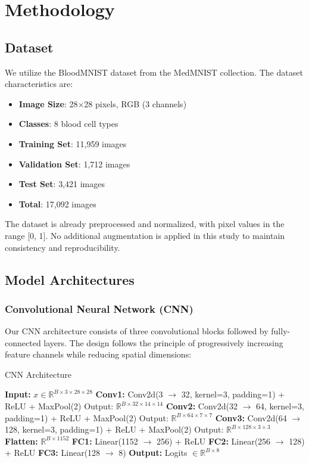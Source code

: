 \documentclass[runningheads]{llncs}
\begin{document}
\section{Methodology}

\subsection{Dataset}

We utilize the BloodMNIST dataset from the MedMNIST collection. The dataset characteristics are:

\begin{itemize}
    \item \textbf{Image Size}: 28$\times$28 pixels, RGB (3 channels)
    \item \textbf{Classes}: 8 blood cell types
    \item \textbf{Training Set}: 11,959 images
    \item \textbf{Validation Set}: 1,712 images
    \item \textbf{Test Set}: 3,421 images
    \item \textbf{Total}: 17,092 images
\end{itemize}

The dataset is already preprocessed and normalized, with pixel values in the range [0, 1]. No additional augmentation is applied in this study to maintain consistency and reproducibility.

\subsection{Model Architectures}

\subsubsection{Convolutional Neural Network (CNN)}

Our CNN architecture consists of three convolutional blocks followed by fully-connected layers. The design follows the principle of progressively increasing feature channels while reducing spatial dimensions:

\begin{algorithm}
\caption{CNN Architecture}
\begin{algorithmic}[1]
\STATE \textbf{Input:} $x \in \mathbb{R}^{B \times 3 \times 28 \times 28}$
\STATE \textbf{Conv1:} Conv2d(3 $\rightarrow$ 32, kernel=3, padding=1) + ReLU + MaxPool(2)
\STATE \quad Output: $\mathbb{R}^{B \times 32 \times 14 \times 14}$
\STATE \textbf{Conv2:} Conv2d(32 $\rightarrow$ 64, kernel=3, padding=1) + ReLU + MaxPool(2)
\STATE \quad Output: $\mathbb{R}^{B \times 64 \times 7 \times 7}$
\STATE \textbf{Conv3:} Conv2d(64 $\rightarrow$ 128, kernel=3, padding=1) + ReLU + MaxPool(2)
\STATE \quad Output: $\mathbb{R}^{B \times 128 \times 3 \times 3}$
\STATE \textbf{Flatten:} $\mathbb{R}^{B \times 1152}$
\STATE \textbf{FC1:} Linear(1152 $\rightarrow$ 256) + ReLU
\STATE \textbf{FC2:} Linear(256 $\rightarrow$ 128) + ReLU
\STATE \textbf{FC3:} Linear(128 $\rightarrow$ 8)
\STATE \textbf{Output:} Logits $\in \mathbb{R}^{B \times 8}$
\end{algorithmic}
\end{algorithm}
\end{document}

